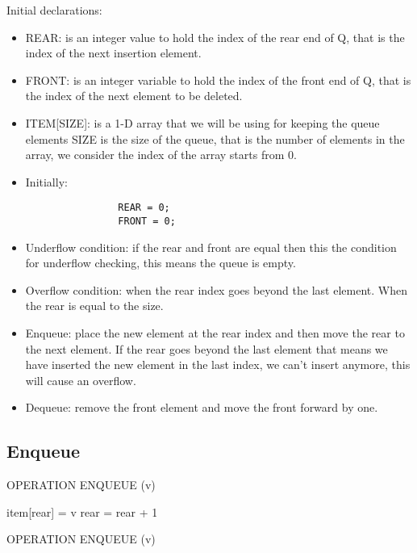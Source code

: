 Initial declarations: 
\begin{center}
    \begin{itemize}
        \item REAR: is an integer value to hold the index of the rear end of Q, that is the index of the next insertion element. 
        \item FRONT: is an integer variable to hold the index of the front end of Q, that is the index of the next element to be deleted. 
        \item ITEM[SIZE]: is a 1-D array that we will be using for keeping the queue elements SIZE is the size of the queue, that is the number of elements in the array, we consider the index of the array starts from 0.
        \item Initially: 
            \begin{lstlisting}
                REAR = 0; 
                FRONT = 0;
            \end{lstlisting}
        
        \item Underflow condition: if the rear and front are equal then this the condition for underflow checking, this means the queue is empty. 
        \item Overflow condition: when the rear index goes beyond the last element. When the rear is equal to the size.
        \item Enqueue: place the new element at the rear index and then move the rear to the next element. If the rear goes beyond the last element that means we have inserted the new element in the last index, we can't insert anymore, this will cause an overflow.
        \item Dequeue: remove the front element and move the front forward by one. 
    \end{itemize}
\end{center}

\subsection{Enqueue}
\begin{algorithm}[H]
    \SetAlgoLined
    OPERATION ENQUEUE (v)
    \BlankLine
    \large
    
    item[rear] = v\; 
    rear = rear + 1\; 
    \caption{OPERATION ENQUEUE (v)}
\end{algorithm}

